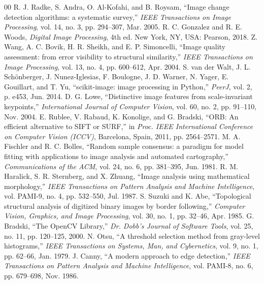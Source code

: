 \documentclass[conference]{IEEEtran}
\begin{document}
\begin{thebibliography}{00}
 R. J. Radke, S. Andra, O. Al-Kofahi, and B. Roysam, ``Image change detection algorithms: a systematic survey,'' \textit{IEEE Transactions on Image Processing}, vol. 14, no. 3, pp. 294--307, Mar. 2005.
 R. C. Gonzalez and R. E. Woods, \textit{Digital Image Processing}, 4th ed. New York, NY, USA: Pearson, 2018.
 Z. Wang, A. C. Bovik, H. R. Sheikh, and E. P. Simoncelli, ``Image quality assessment: from error visibility to structural similarity,'' \textit{IEEE Transactions on Image Processing}, vol. 13, no. 4, pp. 600--612, Apr. 2004.
 S. van der Walt, J. L. Sch{\"o}nberger, J. Nunez-Iglesias, F. Boulogne, J. D. Warner, N. Yager, E. Gouillart, and T. Yu, ``scikit-image: image processing in Python,'' \textit{PeerJ}, vol. 2, p. e453, Jun. 2014.
 D. G. Lowe, ``Distinctive image features from scale-invariant keypoints,'' \textit{International Journal of Computer Vision}, vol. 60, no. 2, pp. 91--110, Nov. 2004.
 E. Rublee, V. Rabaud, K. Konolige, and G. Bradski, ``ORB: An efficient alternative to SIFT or SURF,'' in \textit{Proc. IEEE International Conference on Computer Vision (ICCV)}, Barcelona, Spain, 2011, pp. 2564--2571.
 M. A. Fischler and R. C. Bolles, ``Random sample consensus: a paradigm for model fitting with applications to image analysis and automated cartography,'' \textit{Communications of the ACM}, vol. 24, no. 6, pp. 381--395, Jun. 1981.
 R. M. Haralick, S. R. Sternberg, and X. Zhuang, ``Image analysis using mathematical morphology,'' \textit{IEEE Transactions on Pattern Analysis and Machine Intelligence}, vol. PAMI-9, no. 4, pp. 532--550, Jul. 1987.
 S. Suzuki and K. Abe, ``Topological structural analysis of digitized binary images by border following,'' \textit{Computer Vision, Graphics, and Image Processing}, vol. 30, no. 1, pp. 32--46, Apr. 1985.
 G. Bradski, ``The OpenCV Library,'' \textit{Dr. Dobb's Journal of Software Tools}, vol. 25, no. 11, pp. 120--125, 2000.
 N. Otsu, ``A threshold selection method from gray-level histograms,'' \textit{IEEE Transactions on Systems, Man, and Cybernetics}, vol. 9, no. 1, pp. 62--66, Jan. 1979.
 J. Canny, ``A modern approach to edge detection,'' \textit{IEEE Transactions on Pattern Analysis and Machine Intelligence}, vol. PAMI-8, no. 6, pp. 679--698, Nov. 1986.
\end{thebibliography}
\end{document}
